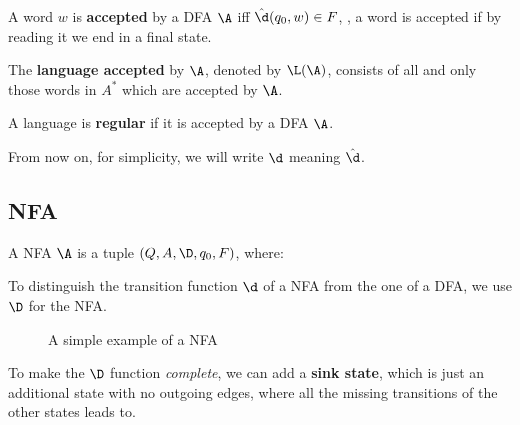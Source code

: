 \documentclass[oneside]{academica}
\begin{document}
\begin{theorem*}
  A word $w$ is \textbf{accepted} by a DFA $\A$ iff $\hat{\d}(q_0,w) \in F$, \ie, a word is accepted if by reading it we end in a final state.

  The \textbf{language accepted} by $\A$, denoted by $\L(\A)$, consists of all and only those words in $A^*$ which are accepted by $\A$.
\end{theorem*}

\begin{definition*}
  A language is \textbf{regular} if it is accepted by a DFA $\A$.
\end{definition*}

\begin{note}
  From now on, for simplicity, we will write $\d$ meaning $\hat{\d}$.
\end{note}

\subsection{NFA}

\begin{definition*}
  A NFA $\A$ is a tuple $\left( Q, A, \D, q_0, F \right)$, where:
\end{definition*}

\begin{note}
  To distinguish the transition function $\d$ of a NFA from the one of a DFA, we use $\D$ for the NFA.
\end{note}

\begin{figure}[H]
  \centering
  
  \caption{A simple example of a NFA}
\end{figure}

To make the $\D$ function \textit{complete}, we can add a \textbf{sink state}, which is just an additional state with no outgoing edges, where all the missing transitions of the other states leads to.
\end{document}
